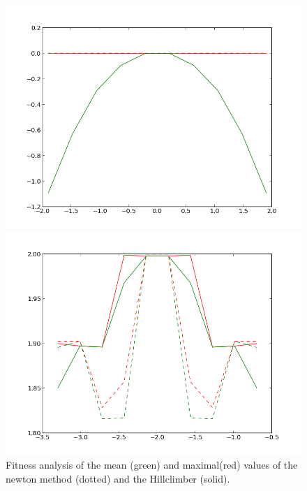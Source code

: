 \documentclass{scrartcl}
\begin{document}
\begin{figure}[H]
\centering
\begin{minipage}{.5\textwidth}
  \centering
  \includegraphics[width=.8\linewidth]{img/ex1/analysis_squared_newton_hill.png}
\end{minipage}%
\begin{minipage}{.5\textwidth}
  \centering
  \includegraphics[width=.8\linewidth]{img/ex1/analysis_trimodal_newton_hill.png}
\end{minipage}
\caption{Fitness analysis of the mean (green) and maximal(red) values of the newton method (dotted) and the Hillclimber (solid).}
\label{fig:}
\end{figure}
\end{document}
